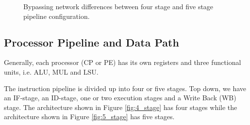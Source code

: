 \begin{figure}[t]
\centering
{}
\hfil
{}
\caption{Bypassing network differences between four stage and five stage pipeline configuration.}
\label{fig:datapath_pipeline_conf}
\end{figure}

\subsection{Processor Pipeline and Data Path}\label{sec:processor}

Generally, each processor (CP or PE) has its own registers and three functional units, i.e. ALU, MUL and LSU. 

The instruction pipeline is divided up into four or five stages. Top down, we have an IF-stage, an ID-stage, one or two execution stages and a Write Back (WB) stage. The architecture shown in Figure \ref{fig:4_stage} has four stages while the architecture shown in Figure \ref{fig:5_stage} has five stages.\\

